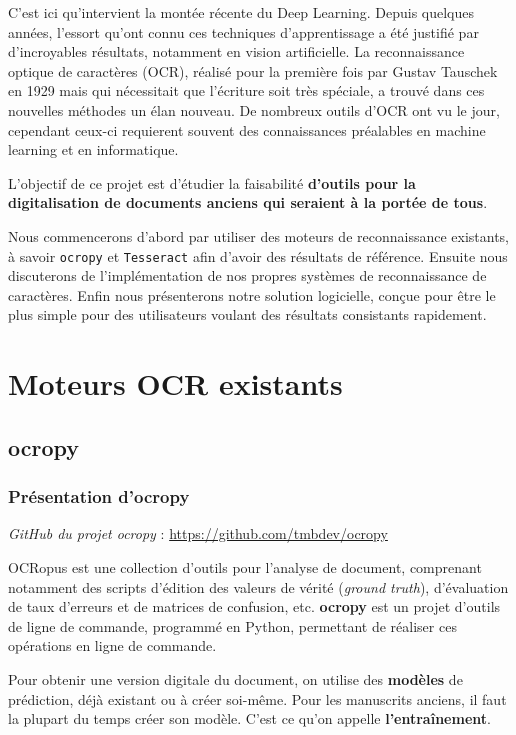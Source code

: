 \documentclass{report}
\begin{document}
C'est ici qu'intervient la montée récente du Deep Learning.
Depuis quelques années, l'essort qu'ont connu ces techniques d'apprentissage a été justifié par d'incroyables résultats, notamment en vision artificielle.
La reconnaissance optique de caractères (OCR), réalisé pour la première fois par Gustav Tauschek en 1929 mais qui nécessitait que l'écriture soit très spéciale, a trouvé dans ces nouvelles méthodes un élan nouveau.
De nombreux outils d'OCR ont vu le jour, cependant ceux-ci requierent souvent des connaissances préalables en machine learning et en informatique.

L'objectif de ce projet est d'étudier la faisabilité \textbf{d'outils pour la digitalisation de documents anciens qui seraient à la portée de tous}.

Nous commencerons d'abord par utiliser des moteurs de reconnaissance existants, à savoir \texttt{ocropy} et \texttt{Tesseract} afin d'avoir des résultats de référence.
Ensuite nous discuterons de l'implémentation de nos propres systèmes de reconnaissance de caractères.
Enfin nous présenterons notre solution logicielle, conçue pour être le plus simple pour des utilisateurs voulant des résultats consistants rapidement.

\newpage 
\tableofcontents
\newpage 

\chapter{Moteurs OCR existants}

\section{ocropy}

\subsection{Présentation d'ocropy}

\textit{GitHub du projet ocropy} : \href{https://github.com/tmbdev/ocropy}{https://github.com/tmbdev/ocropy}

OCRopus est une collection d'outils pour l'analyse de document, comprenant notamment des scripts d'édition des valeurs de vérité (\textit{ground truth}), d'évaluation de taux d'erreurs et de matrices de confusion, etc.
\textbf{ocropy} est un projet d'outils de ligne de commande, programmé en Python, permettant de réaliser ces opérations en ligne de commande.

Pour obtenir une version digitale du document, on utilise des \textbf{modèles} de prédiction, déjà existant ou à créer soi-même.
Pour les manuscrits anciens, il faut la plupart du temps créer son modèle. C'est ce qu'on appelle \textbf{l'entraînement}.
\end{document}
